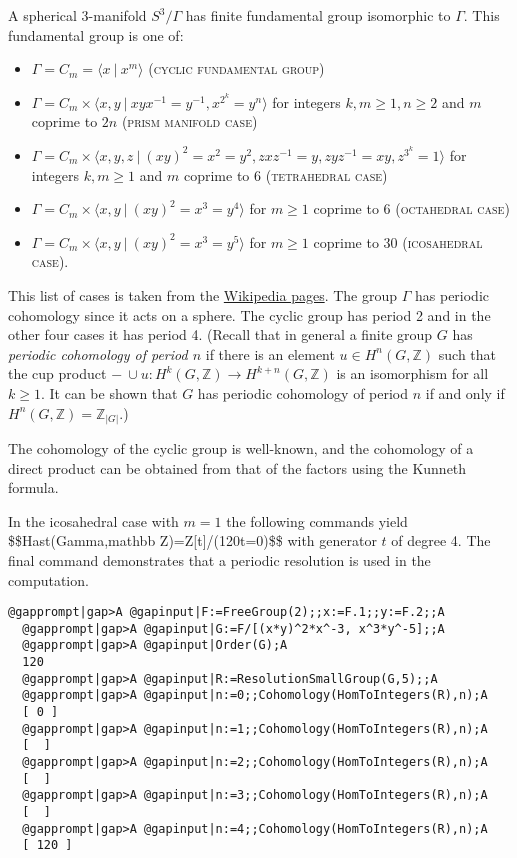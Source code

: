 \documentclass[a4paper,11pt]{report}
\begin{document}
{{ A spherical 3-manifold $S^3/\Gamma$ has finite fundamental group isomorphic to $\Gamma$. This fundamental group is one of: 
\begin{itemize}
\item  $\Gamma=C_m=\langle x\ |\ x^m\rangle$ (\textsc{cyclic fundamental group})
\item  $\Gamma=C_m\times \langle x,y \ |\ xyx^{-1}=y^{-1}, x^{2^k}=y^n \rangle$ for integers $k, m\ge 1, n\ge 2$ and $m$ coprime to $2n$ (\textsc{prism manifold case})
\item  $\Gamma= C_m\times \langle x,y, z \ |\ (xy)^2=x^2=y^2, zxz^{-1}=y, zyz^{-1}=xy,
z^{3^k}=1\rangle $ for integers $k,m\ge 1$ and $m$ coprime to 6 (\textsc{tetrahedral case})
\item  $\Gamma=C_m\times\langle x,y\ |\ (xy)^2=x^3=y^4\rangle $ for $m\ge 1$ coprime to 6 (\textsc{octahedral case})
\item $\Gamma=C_m\times \langle x,y\ |\ (xy)^2=x^3=y^5\rangle $ for $m\ge 1$ coprime to 30 (\textsc{icosahedral case}).
\end{itemize}
 This list of cases is taken from the \href{https://en.wikipedia.org/wiki/Spherical_3-manifold} {Wikipedia pages}. The group $\Gamma$ has periodic cohomology since it acts on a sphere. The cyclic group has period
2 and in the other four cases it has period 4. (Recall that in general a
finite group $G$ has \emph{periodic cohomology of period $n$} if there is an element $u\in H^n(G,\mathbb Z)$ such that the cup product $-\ \cup u\colon H^k(G,\mathbb Z) \rightarrow H^{k+n}(G,\mathbb Z)$ is an isomorphism for all $k\ge 1$. It can be shown that $G$ has periodic cohomology of period $n$ if and only if $H^{n}(G,\mathbb Z)=\mathbb Z_{|G|}$.) 

The cohomology of the cyclic group is well-known, and the cohomology of a
direct product can be obtained from that of the factors using the Kunneth
formula. 

 In the icosahedral case with $m=1$ the following commands yield
\$\$H\texttt{}\texttt{}ast(\texttt{}Gamma,\texttt{}mathbb
Z)=Z[t]/(120t=0)\$\$ with generator $t$ of degree 4. The final command demonstrates that a periodic resolution is used
in the computation. 
\begin{Verbatim}[commandchars=@|A,fontsize=\small,frame=single,label=Example]
  @gapprompt|gap>A @gapinput|F:=FreeGroup(2);;x:=F.1;;y:=F.2;;A
  @gapprompt|gap>A @gapinput|G:=F/[(x*y)^2*x^-3, x^3*y^-5];;A
  @gapprompt|gap>A @gapinput|Order(G);A
  120
  @gapprompt|gap>A @gapinput|R:=ResolutionSmallGroup(G,5);;A
  @gapprompt|gap>A @gapinput|n:=0;;Cohomology(HomToIntegers(R),n);A
  [ 0 ]
  @gapprompt|gap>A @gapinput|n:=1;;Cohomology(HomToIntegers(R),n);A
  [  ]
  @gapprompt|gap>A @gapinput|n:=2;;Cohomology(HomToIntegers(R),n);A
  [  ]
  @gapprompt|gap>A @gapinput|n:=3;;Cohomology(HomToIntegers(R),n);A
  [  ]
  @gapprompt|gap>A @gapinput|n:=4;;Cohomology(HomToIntegers(R),n);A
  [ 120 ]
  

\end{Verbatim}}}
\end{document}
